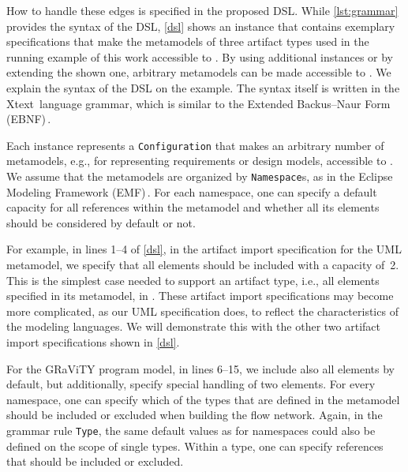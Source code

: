 How to handle these edges is specified in the proposed DSL.
While \autoref{lst:grammar} provides the syntax of the DSL, \autoref{dsl} shows an instance that contains exemplary specifications that make the metamodels of three artifact types used in the running example of this work accessible to \appr{}.
By using additional instances or by extending the shown one, arbitrary metamodels can be made accessible to \appr{}.
We explain the syntax of the DSL on the example.
The syntax itself is written in the Xtext\,\cite{xtext} language grammar, which is similar to the Extended Backus–Naur Form (EBNF)\,\cite{Yue2014}.

Each instance represents a \texttt{Configuration} that makes an arbitrary number of metamodels, e.g., for representing requirements or design models, accessible to \appr{}.
We assume that the metamodels are organized by \texttt{Namespace}s, as in the Eclipse Modeling Framework (EMF)\,\cite{steinberg2008emf, EMFBook}.
For each namespace, one can specify a default capacity for all references within the metamodel and whether all its elements should be considered by default or not.

For example, in lines 1--4 of \autoref{dsl}, in the artifact import specification for the UML metamodel, we specify that all elements should be included with a capacity of~2.
This is the simplest case needed to support an artifact type, i.e., all elements specified in its metamodel, in \appr{}.
These artifact import specifications may become more complicated, as our UML specification does, to reflect the characteristics of the modeling languages.
We will demonstrate this with the other two artifact import specifications shown in \autoref{dsl}.

For the GRaViTY program model, in lines 6--15, we include also all elements by default, but additionally, specify special handling of two elements.
For every namespace, one can specify which of the types that are defined in the metamodel should be included or excluded when building the flow network.
Again, in the grammar rule \texttt{Type}, the same default values as for namespaces could also be defined on the scope of single types.
Within a type, one can specify references that should be included or excluded.

